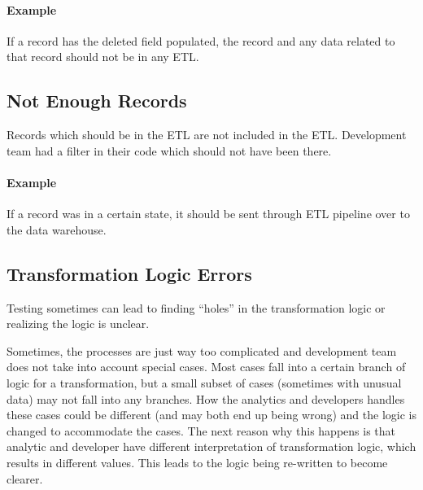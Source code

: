 \paragraph*{Example} If a record has the deleted field populated, the record and any data related to that record should not be in any ETL.


\subsection*{Not Enough Records}

Records which should be in the ETL are not included in the ETL.
Development team had a filter in their code which should not have been there.

\paragraph*{Example} If a record was in a certain state, it should be sent through ETL pipeline over to the data warehouse.


\subsection*{Transformation Logic Errors}

Testing sometimes can lead to finding \enquote{holes} in the transformation logic or realizing the logic is unclear.

Sometimes, the processes are just way too complicated and development team does not take into account special cases.
Most cases fall into a certain branch of logic for a transformation, but a small subset of cases (sometimes with unusual data) may not fall into any branches.
How the analytics and developers handles these cases could be different (and may both end up being wrong) and the logic is changed to accommodate the cases.
The next reason why this happens is that analytic and developer have different interpretation of transformation logic, which results in different values.
This leads to the logic being re-written to become clearer.

